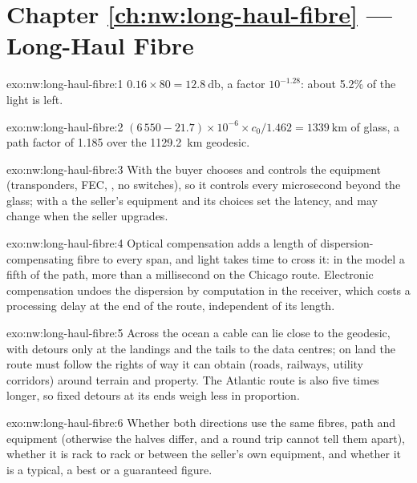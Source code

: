 \section*{Chapter \ref{ch:nw:long-haul-fibre} --- Long-Haul Fibre}

\begin{solution}{exo:nw:long-haul-fibre:1}
$0.16 \times 80 = \qty{12.8}{\decibel}$, a factor $10^{-1.28}$: about 5.2\% of the light is left.
\end{solution}

\begin{solution}{exo:nw:long-haul-fibre:2}
$(6\,550 - 21.7) \times 10^{-6} \times c_0 / 1.462 = \qty{1339}{\kilo\metre}$ of glass, a path factor of 1.185 over the \qty{1129.2}{\kilo\metre}
geodesic.
\end{solution}

\begin{solution}{exo:nw:long-haul-fibre:3}
With  the buyer chooses and controls the equipment (transponders, FEC, , no switches), so it controls every
microsecond beyond the glass; with a  the seller's equipment and its choices set the latency, and may change when the seller
upgrades.
\end{solution}

\begin{solution}{exo:nw:long-haul-fibre:4}
Optical compensation adds a length of dispersion-compensating fibre to every span, and light takes time to cross it: in the model a fifth of the
path, more than a millisecond on the Chicago route. Electronic compensation undoes the dispersion by computation in the receiver, which costs a
processing delay at the end of the route, independent of its length.
\end{solution}

\begin{solution}{exo:nw:long-haul-fibre:5}
Across the ocean a cable can lie close to the geodesic, with detours only at the landings and the tails to the data centres; on land the route
must follow the rights of way it can obtain (roads, railways, utility corridors) around terrain and property. The Atlantic route is also five
times longer, so fixed detours at its ends weigh less in proportion.
\end{solution}

\begin{solution}{exo:nw:long-haul-fibre:6}
Whether both directions use the same fibres, path and equipment (otherwise the halves differ, and a round trip cannot tell them apart), whether it
is rack to rack or between the seller's own equipment, and whether it is a typical, a best or a guaranteed figure.
\end{solution}


